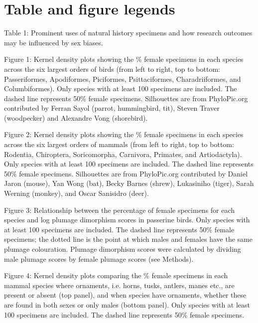 \documentclass[a4paper, 12pt]{article}
\begin{document}
\newpage
\section{Table and figure legends}

Table 1: Prominent uses of natural history specimens and how research outcomes may be influenced by sex biases.

Figure 1: Kernel density plots showing the \% female specimens in each species across the six largest orders of birds (from left to right, top to bottom: Passeriformes, Apodiformes, Piciformes, Psittaciformes, Charadriiformes, and Columbiformes). 
  Only species with at least 100 specimens are included. 
  The dashed line represents 50\% female specimens. 
  Silhouettes are from PhyloPic.org contributed by Ferran Sayol (parrot, hummingbird, tit), Steven Traver (woodpecker) and Alexandre Vong (shorebird).

Figure 2: Kernel density plots showing the \% female specimens in each species across the six largest orders of mammals (from left to right, top to bottom: Rodentia, Chiroptera, Soricomorpha, Carnivora, Primates, and Artiodactyla). 
  Only species with at least 100 specimens are included. 
  The dashed line represents 50\% female specimens. 
  Silhouettes are from PhyloPic.org contributed by Daniel Jaron (mouse), Yan Wong (bat), Becky Barnes (shrew), Lukasiniho (tiger), Sarah Werning (monkey), and Oscar Sanisidro (deer).

Figure 3: Relationship between the percentage of female specimens for each species and log plumage dimorphism scores in passerine birds. 
  Only species with at least 100 specimens are included. 
  The dashed line represents 50\% female specimens; the dotted line is the point at which males and females have the same plumage colouration. 
  Plumage dimorphism scores were calculated by dividing male plumage scores by female plumage scores (see Methods).

Figure 4: Kernel density plots comparing the \% female specimens in each mammal species where ornaments, i.e. horns, tusks, antlers, manes etc., are present or absent (top panel), and when species have ornaments, whether these are found in both sexes or only males (bottom panel). 
  Only species with at least 100 specimens are included. 
  The dashed line represents 50\% female specimens.
\end{document}
